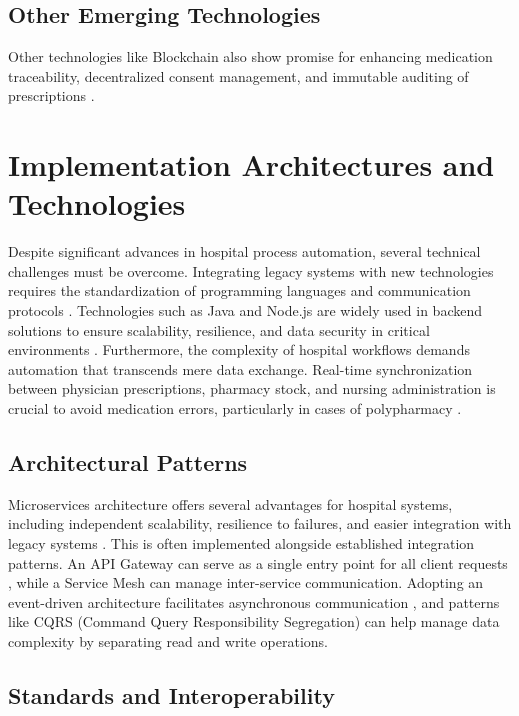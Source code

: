 \subsection{Other Emerging Technologies}

Other technologies like Blockchain also show promise for enhancing medication traceability, decentralized consent management, and immutable auditing of prescriptions \cite{franzoso2014}.

\section{Implementation Architectures and Technologies}

Despite significant advances in hospital process automation, several technical challenges must be overcome. Integrating legacy systems with new technologies requires the standardization of programming languages and communication protocols \cite{stanojevic2023conceptualizing}. Technologies such as Java and Node.js are widely used in backend solutions to ensure scalability, resilience, and data security in critical environments \cite{nkenyereye2016performance}. Furthermore, the complexity of hospital workflows demands automation that transcends mere data exchange. Real-time synchronization between physician prescriptions, pharmacy stock, and nursing administration is crucial to avoid medication errors, particularly in cases of polypharmacy \citep{Tukukino2022, falconer2021pharmacist}.

\subsection{Architectural Patterns}

Microservices architecture offers several advantages for hospital systems, including independent scalability, resilience to failures, and easier integration with legacy systems \cite{shermock2023, vaghasiya2023, newman2021}. This is often implemented alongside established integration patterns. An API Gateway can serve as a single entry point for all client requests \cite{newman2021}, while a Service Mesh can manage inter-service communication. Adopting an event-driven architecture facilitates asynchronous communication \cite{fowler2018}, and patterns like CQRS (Command Query Responsibility Segregation) can help manage data complexity by separating read and write operations.

\subsection{Standards and Interoperability}

